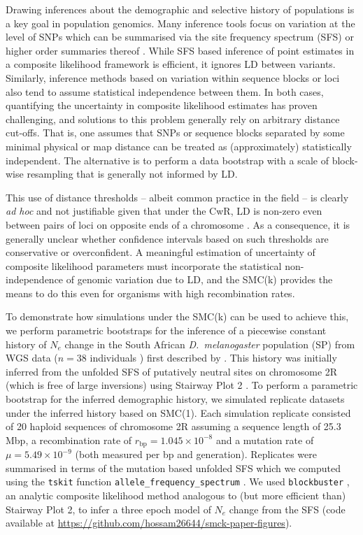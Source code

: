 \documentclass[9pt,twocolumn,twoside,lineno]{gsajnl}
\begin{document}
Drawing inferences about the demographic and selective history of populations
is a key goal in population genomics. Many inference tools focus on variation
at the level of SNPs which can be summarised via the site frequency spectrum
(SFS) or higher order summaries thereof \citep{gutenkunst_inferring_2009,
excoffier_fastsimcoal2_2021, liu_stairway_2020, omarjee_blockbuster_2026}.
While SFS based inference of point estimates in a composite likelihood
framework is efficient, it ignores LD between variants. Similarly, inference
methods based on variation within sequence blocks
\citep{laetsch_demographically_2023} or loci also tend to assume statistical
independence between them. In both cases, quantifying the uncertainty in
composite likelihood estimates has proven challenging, and solutions to this problem generally rely on arbitrary distance cut-offs. That is, one assumes that SNPs or sequence blocks separated by some minimal physical or map distance can be treated as (approximately) statistically independent. The alternative is to perform a data bootstrap with a scale of block-wise resampling that is generally not informed by LD.

This use of distance thresholds -- albeit common practice in the field -- is clearly \emph{ad hoc} and not justifiable given that under the CwR, LD is non-zero even between pairs of loci on opposite ends of a chromosome \citep{pluzhnikov1996optimal, baird2015exploring}. As a consequence, it is generally unclear whether confidence intervals based on such thresholds are conservative or overconfident. A meaningful estimation of uncertainty of composite likelihood parameters must incorporate the statistical non-independence of genomic variation due to LD, and the SMC(k) provides the means to do this even for organisms with high recombination rates.

To demonstrate how simulations under the SMC(k) can be used to achieve this, we perform parametric bootstraps for the inference of a piecewise constant history of $N_e$ change in the South African \textit{D.\ melanogaster} population (SP) from WGS data ($n =38$ individuals \citep{pool2012}) first described by \citet{chen_sub-saharan_2024}. This history was initially inferred from the unfolded SFS of putatively neutral sites on chromosome 2R (which is free of large inversions) using Stairway Plot 2 \citep{liu_stairway_2020}. To perform a parametric bootstrap for the inferred demographic history, we simulated replicate datasets under the inferred history based on SMC(1). Each simulation replicate consisted of 20 haploid sequences of chromosome 2R assuming a sequence length of 25.3 Mbp, a recombination rate of $r_\mathrm{bp} = 1.045\times 10^{-8}$ and a mutation rate of $\mu = 5.49\times10^{-9}$ (both measured per bp and generation). Replicates were summarised in terms of the mutation based unfolded SFS which we computed using the \texttt{tskit} function \texttt{allele\_frequency\_spectrum} \citep{Ralph2020Stats}. We used \texttt{blockbuster} \citep{omarjee_blockbuster_2026}, an analytic composite likelihood method analogous to (but more efficient than) Stairway Plot 2, to infer a three epoch model of $N_e$ change from the SFS (code available at \href{https://github.com/hossam26644/smck-paper-figures}{https://github.com/hossam26644/smck-paper-figures}).
\end{document}

